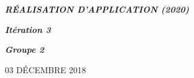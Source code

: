 \documentclass[a4paper , 10pt]{article}
\begin{document}
\begin{center}
\begin{huge}
\textit{\textbf{RÉALISATION D'APPLICATION (2020)}}
\end{huge}
\end{center}
\begin{center}
\begin{LARGE}
\textit{\textbf{Itération 3}}
\end{LARGE}
\end{center}
\textit{}
\textit{}
\begin{center}
\begin{flushleft}
\begin{Large}
\textbf{\textit{Groupe 2}}
\end{Large}
\end{flushleft}
\end{center}
\begin{center}
03 D\'ECEMBRE 2018
\end{center}
\end{document}
